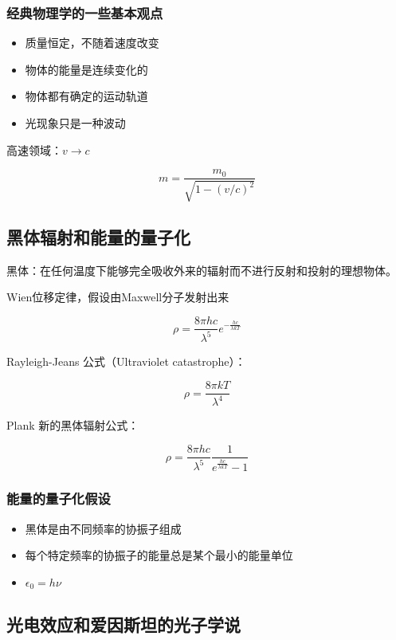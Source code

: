 \documentclass[a4paper]{ctexrep}
\begin{document}
    \subsubsection{经典物理学的一些基本观点}

    \begin{itemize}
        \item 质量恒定，不随着速度改变
        \item 物体的能量是连续变化的
        \item 物体都有确定的运动轨道
        \item 光现象只是一种波动
    \end{itemize}

    高速领域：$v \rightarrow c$

    \[
        m = \frac{m_0}{\sqrt{1 - (v/c)^2}}  
    \]

    \subsection{黑体辐射和能量的量子化}

    黑体：在任何温度下能够完全吸收外来的辐射而不进行反射和投射的理想物体。

    Wien位移定律，假设由Maxwell分子发射出来

    \[ 
        \rho = \frac{8 \pi h c}{\lambda^5}e^{-\frac{hc}{\lambda kT}}
    \]  

    Rayleigh-Jeans 公式（Ultraviolet catastrophe）：

    \[
        \rho = \frac{8 \pi k T}{\lambda^4}  
    \]

    Plank 新的黑体辐射公式：

    \[ 
        \rho = \frac{8 \pi h c}{\lambda ^5} \frac{1}{e^{\frac{hc}{\lambda k T}} - 1}
    \]

    \subsubsection{能量的量子化假设}

    \begin{itemize}
        \item 黑体是由不同频率的协振子组成
        \item 每个特定频率的协振子的能量总是某个最小的能量单位
        \item $\epsilon _0 = h\nu$
    \end{itemize}


    \subsection{光电效应和爱因斯坦的光子学说}
\end{document}
